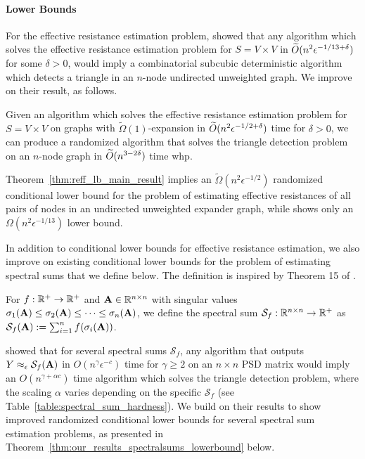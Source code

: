 \paragraph{Lower Bounds} 
For the effective resistance estimation problem, \cite{musco2017spectrum} showed that any algorithm which solves the effective resistance estimation problem for $S = V \times V$ in $\widetilde{O}( {n^2\epsilon^{-1/13 + \delta}} )$ for some $\delta > 0$, would imply a combinatorial subcubic deterministic algorithm which detects a triangle in an $n$-node undirected unweighted graph. We improve on their result, as follows. 

\begin{theorem}\label{thm:reff_lb_main_result} Given an algorithm which solves the effective resistance estimation problem for $S = V\times V$ on graphs with $\widetilde{\Omega}(1)$-expansion in $\widetilde{O}( {n^2\epsilon^{-1/2 + \delta}} )$ time for $\delta > 0$, we can produce a randomized algorithm that solves the triangle detection problem on an $n$-node graph in $\widetilde{O}( {n^{3-2\delta}} )$ time whp. 

\end{theorem}
Theorem~\ref{thm:reff_lb_main_result} implies an $\widetilde{\Omega}(n^2\epsilon^{-1/2})$ randomized conditional lower bound for the problem of estimating effective resistances of all pairs of nodes in an undirected unweighted expander graph, while \cite{musco2017spectrum} shows only an $\Omega(n^2\epsilon^{-1/13})$ lower bound. 

In addition to conditional lower bounds for effective resistance estimation, we also improve on existing conditional lower bounds for the problem of estimating spectral sums that we define below. The definition is inspired by Theorem 15 of \cite{musco2017spectrum}.

\begin{definition}\label{def:spectral_sum} For $f:\mathbb{R}^+ \to \mathbb{R}^+$ and $\mathbf{A} \in \mathbb{R}^{n \times n}$ with singular values $\sigma_1(\mathbf{A}) \leq \sigma_2(\mathbf{A}) \leq \cdots \leq \sigma_n(\mathbf{A})$, we define the spectral sum $\mathcal{S}_f : \mathbb{R}^{n \times n} \to \mathbb{R}^+$ as $\mathcal{S}_f (\mathbf{A}) := \sum_{i=1}^n f (\sigma_i(\mathbf{A}))$.
\end{definition}

\cite{musco2017spectrum} showed that for several spectral sums $\mathcal{S}_f$, any algorithm that outputs $Y \approx_\epsilon \mathcal{S}_f(\mathbf{A})$ in $O(n^\gamma\epsilon^{-c})$ time for $\gamma \geq 2$ on an $n \times n$ PSD matrix would imply an $O(n^{\gamma + \alpha c})$ time algorithm which solves the triangle detection problem, where the scaling $\alpha$ varies depending on the specific $\mathcal{S}_f$ (see Table~\ref{table:spectral_sum_hardness}). We build on their results to show improved randomized conditional lower bounds for several spectral sum estimation problems, as presented in Theorem~\ref{thm:our_results_spectralsums_lowerbound} below. 

